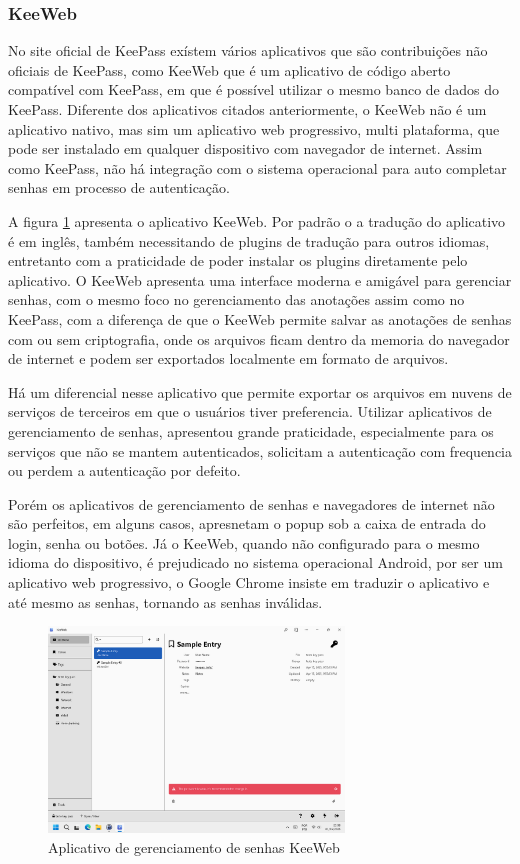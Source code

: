 \documentclass[12pt]{article}
\begin{document}
\subsubsection{KeeWeb}

No site oficial de KeePass exístem vários aplicativos que são contribuições não oficiais
de KeePass, como KeeWeb que é um aplicativo de código aberto compatível com KeePass, em
que é possível utilizar o mesmo banco de dados do KeePass.
Diferente dos aplicativos citados anteriormente, o KeeWeb não é um aplicativo
nativo, mas sim um aplicativo web progressivo, multi plataforma, que pode ser instalado
em qualquer dispositivo com navegador de internet.
Assim como KeePass, não há integração com o sistema operacional para auto completar senhas
em processo de autenticação.

A figura \ref{fig:KeeWeb} apresenta o aplicativo KeeWeb.
Por padrão o a tradução do aplicativo é em inglês, também necessitando de plugins de
tradução para outros idiomas, entretanto com a praticidade de poder instalar os plugins
diretamente pelo aplicativo.
O KeeWeb apresenta uma interface moderna e amigável para gerenciar senhas, com o mesmo foco
no gerenciamento das anotações assim como no KeePass, com a diferença de que o KeeWeb
permite salvar as anotações de senhas com ou sem criptografia, onde os arquivos ficam
dentro da memoria do navegador de internet e podem ser exportados localmente em formato de
arquivos.

Há um diferencial nesse aplicativo que permite exportar os arquivos em nuvens de serviços
de terceiros em que o usuários tiver preferencia.
Utilizar aplicativos de gerenciamento de senhas, apresentou grande praticidade,
especialmente para os serviços que não se mantem autenticados, solicitam a
autenticação com frequencia ou perdem a autenticação por defeito.

Porém os aplicativos de gerenciamento de senhas e navegadores de internet não
são perfeitos, em alguns casos, apresnetam o popup sob a caixa de entrada do
login, senha ou botões.
Já o KeeWeb, quando não configurado para o mesmo idioma do dispositivo, é
prejudicado no sistema operacional Android, por ser um aplicativo web progressivo,
o Google Chrome insiste em traduzir o aplicativo e até mesmo as senhas, tornando
as senhas inválidas.

\begin{figure}[h!]
  \centering
  \includegraphics[width=0.7\textwidth]{./assets/keeweb.png}
  \caption{Aplicativo de gerenciamento de senhas KeeWeb}
  \label{fig:KeeWeb}
\end{figure}
\end{document}
